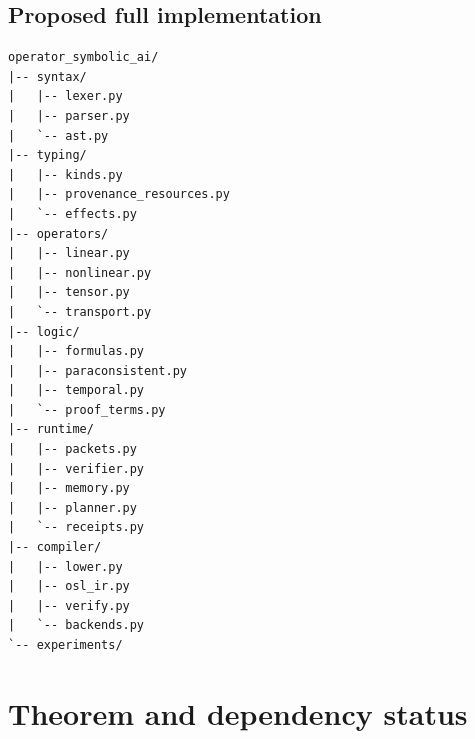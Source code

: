 \documentclass[11pt]{article}
\theoremstyle{definition}
\theoremstyle{remark}
\begin{document}
\subsection{Proposed full implementation}
\begin{verbatim}
operator_symbolic_ai/
|-- syntax/
|   |-- lexer.py
|   |-- parser.py
|   `-- ast.py
|-- typing/
|   |-- kinds.py
|   |-- provenance_resources.py
|   `-- effects.py
|-- operators/
|   |-- linear.py
|   |-- nonlinear.py
|   |-- tensor.py
|   `-- transport.py
|-- logic/
|   |-- formulas.py
|   |-- paraconsistent.py
|   |-- temporal.py
|   `-- proof_terms.py
|-- runtime/
|   |-- packets.py
|   |-- verifier.py
|   |-- memory.py
|   |-- planner.py
|   `-- receipts.py
|-- compiler/
|   |-- lower.py
|   |-- osl_ir.py
|   |-- verify.py
|   `-- backends.py
`-- experiments/
\end{verbatim}

\section{Theorem and dependency status}
\end{document}
